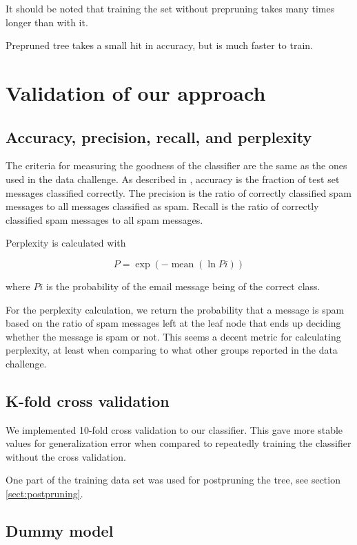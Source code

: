 \documentclass[a4paper,10pt]{article}
\begin{document}
It should be noted that training the set without prepruning takes many
times longer than with it.

Prepruned tree takes a small hit in accuracy, but is much faster to
train.

\section{Validation of our approach}

\subsection{Accuracy, precision, recall, and perplexity}

The criteria for measuring the goodness of the classifier are the same
as the ones used in the data challenge.  As described in
\cite{termproject}, accuracy is the fraction of test set messages
classified correctly.  The precision is the ratio of correctly
classified spam messages to all messages classified as spam.  Recall is
the ratio of correctly classified spam messages to all spam messages.

Perplexity is calculated with

\begin{equation}
P = \exp(-\operatorname{mean}(\ln{Pi}))
\end{equation}

where $Pi$ is the probability of the email message being of the correct
class.

For the perplexity calculation, we return the probability that a message
is spam based on the ratio of spam messages left at the leaf node that
ends up deciding whether the message is spam or not.  This seems a
decent metric for calculating perplexity, at least when comparing to
what other groups reported in the data challenge.

\subsection{K-fold cross validation}

We implemented 10-fold cross validation to our classifier.  This
gave more stable values for generalization error when compared to
repeatedly training the classifier without the cross validation.

One part of the training data set was used for postpruning the tree, see
section \ref{sect:postpruning}.

\subsection{Dummy model}
\end{document}
